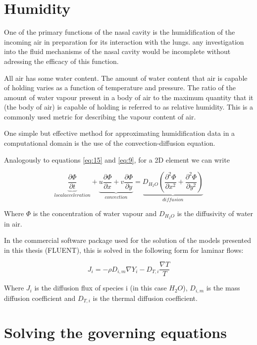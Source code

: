 \section{Humidity}

One of the primary functions of the nasal cavity is the humidification of the incoming air in preparation for its interaction with the lungs. 
any investigation into the fluid mechanisms of the nasal cavity would be incomplete without adressing the efficacy of this function. 

All air has some water content. The amount of water content that air is capable of holding varies as a function of temperature and pressure. The ratio of the amount of water vapour present in a body of air to the maximum quantity that it (the body of air) is capable of holding is referred to as relative humidity. This is a commonly used metric for describing the vapour content of air.

One simple but effective method for approximating humidification data in a computational domain is the use of the convection-diffusion equation.

Analogously to equations \ref{eq:15} and \ref{eq:9}, for a 2D element we can write

\begin{equation} \label{eq:16}
  \underbrace{\frac{\partial \Phi}{\partial t}}_{local acceleration} + \underbrace{u \frac{\partial \Phi}{\partial x} + v \frac{\partial \Phi}{\partial y}}_{convection} = \underbrace{D_{H_{2} O} ( \frac{\partial^2 \Phi}{\partial x^2} + \frac{\partial^2 \Phi}{\partial y^2} )}_{diffusion}
\end{equation} \nocite{Naftali1998}

Where $\Phi$ is the concentration of water vapour and $D_{H_{2} O}$ is the diffusivity of water in air.

In the commercial software package used for the solution of the models presented in this thesis (FLUENT), this is solved in the following form for laminar flows:

\begin{equation} \label{eq:17}
 J_i = -\rho D_{i,m} \nabla Y_i - D_{T, i} \frac{\nabla T}{T}
\end{equation}

Where $J_i$ is the diffusion flux of species i (in this case $H_2 O$), $D_{i,m}$ is the mass diffusion coefficient and $D_{T,i}$ is the thermal diffusion coefficient.
\section{Solving the governing equations}

